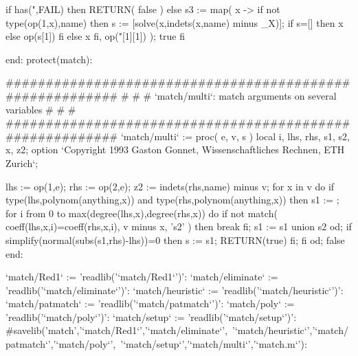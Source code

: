 if has(",FAIL) then RETURN( false )
else s3 := map( x ->
		if not type(op(1,x),name) then
		     s := [solve({x},indets(x,name) minus {_X})];
		     if s=[] then x else op(s[1]) fi
		else x fi, {op("[1][1])} );
     true
     fi

end:
protect(match):

#########################################################
#							#
#  `match/multi`: match arguments on several variables	#
#							#
#########################################################
`match/multi` := proc( e, v, s )
local i, lhs, rhs, s1, s2, x, z2;
option `Copyright 1993 Gaston Gonnet, Wissenschaftliches Rechnen, ETH Zurich`;

lhs := op(1,e);
rhs := op(2,e);
z2 := indets(rhs,name) minus v;
for x in v do if type(lhs,polynom(anything,x)) and
		 type(rhs,polynom(anything,x)) then
    s1 := {};
    for i from 0 to max(degree(lhs,x),degree(rhs,x)) do
	if not match( coeff(lhs,x,i)=coeff(rhs,x,i), v minus {x}, 's2' )
	    then break fi;
	s1 := s1 union s2
	od;
    if simplify(normal(subs(s1,rhs)-lhs))=0 then s := s1;  RETURN(true) fi;
    fi od;
false
end:

`match/Red1` := 'readlib('`match/Red1`')':
`match/eliminate` := 'readlib('`match/eliminate`')':
`match/heuristic` := 'readlib('`match/heuristic`')':
`match/patmatch` := 'readlib('`match/patmatch`')':
`match/poly` := 'readlib('`match/poly`')':
`match/setup` := 'readlib('`match/setup`')':
#savelib('match','`match/Red1`','`match/eliminate`',\
	'`match/heuristic`','`match/patmatch`','`match/poly`',\
	'`match/setup`','`match/multi`','`match.m`'):

